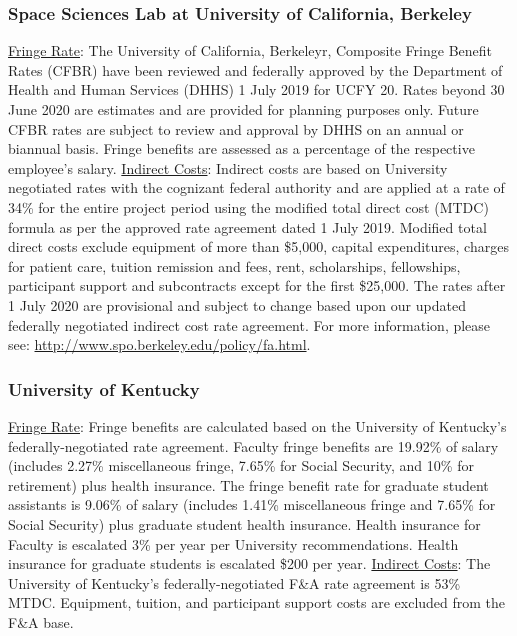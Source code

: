 \documentclass[oneside,11pt]{amsart}
\begin{document}
\subsubsection{Space Sciences Lab at University of California, Berkeley}

\underline{Fringe Rate}: The University of California, Berkeleyr,
Composite Fringe Benefit Rates (CFBR) have been reviewed and
federally approved by the Department of Health and Human Services
(DHHS) 1 July 2019 for UCFY 20. Rates beyond 30 June 2020 are
estimates and are provided for planning purposes only. Future CFBR
rates are subject to review and approval by DHHS on an annual or
biannual basis. Fringe benefits are assessed as a percentage of the
respective employee’s salary. \underline{Indirect Costs}: Indirect
costs are based on University negotiated rates with the cognizant
federal authority and are applied at a rate of 34\% for the entire
project period using the modified total direct cost (MTDC) formula as
per the approved rate agreement dated 1 July 2019. Modified total
direct costs exclude equipment of more than \$5,000, capital
expenditures, charges for patient care, tuition remission and fees,
rent, scholarships, fellowships, participant support and subcontracts
except for the first \$25,000. The rates after 1 July 2020 are
provisional and subject to change based upon our updated federally
negotiated indirect cost rate agreement. For more information, please
see: \url{http://www.spo.berkeley.edu/policy/fa.html}.

\subsubsection{University of Kentucky}

\underline{Fringe Rate}: Fringe benefits are calculated based on the
University of Kentucky’s federally-negotiated rate agreement. Faculty
fringe benefits are 19.92\% of salary (includes 2.27\% miscellaneous
fringe, 7.65\% for Social Security, and 10\% for retirement) plus
health insurance. The fringe benefit rate for graduate student
assistants is 9.06\% of salary (includes 1.41\% miscellaneous fringe
and 7.65\% for Social Security) plus graduate student health
insurance. Health insurance for Faculty is escalated 3\% per year per
University recommendations. Health insurance for graduate students is
escalated \$200 per year. \underline{Indirect Costs}: The University
of Kentucky’s federally-negotiated F\&A rate agreement is 53\% MTDC.
Equipment, tuition, and participant support costs are excluded from
the F\&A base.
\end{document}
